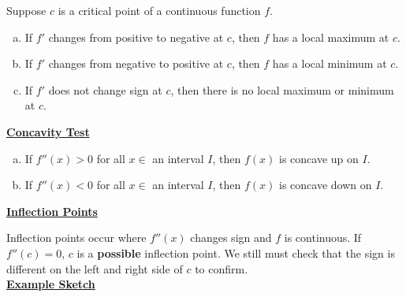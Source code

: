 \documentclass{letter}
\begin{document}
	Suppose $c$ is a critical point of a continuous function $f$.
	\begin{enumerate}[a)]
		\item If $f'$ changes from positive to negative at $c$, then $f$ has a local maximum at $c$.
		\item If $f'$ changes from negative to positive at $c$, then $f$ has a local minimum at $c$.
		\item If $f'$ does not change sign at $c$, then there is no local maximum or minimum at $c$.
	\end{enumerate}
	\underline{\textbf{Concavity Test}}
	\begin{enumerate}[a)]
		\item If $f''(x) > 0$ for all $x \in$ an interval $I$, then $f(x)$ is concave up on $I$.
		\item If $f''(x) <0$ for all $x \in$ an interval $I$, then $f(x)$ is concave down on $I$.
	\end{enumerate}
	\underline{\textbf{Inflection Points}}
	
	Inflection points occur where $f''(x)$ changes sign and $f$ is continuous. If $f''(c) = 0$, $c$ is a \textbf{possible} inflection point. We still must check that the sign is different on the left and right side of $c$ to confirm.
	\pagebreak\\
	\underline{\textbf{Example Sketch}}
	
\end{document}
